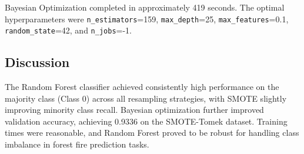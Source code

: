 Bayesian Optimization completed in approximately 419 seconds. The optimal hyperparameters were \texttt{n\_estimators}=159, \texttt{max\_depth}=25, \texttt{max\_features}=0.1, \texttt{random\_state}=42, and \texttt{n\_jobs}=-1.

\subsection{Discussion}

The Random Forest classifier achieved consistently high performance on the majority class (Class 0) across all resampling strategies, with SMOTE slightly improving minority class recall. Bayesian optimization further improved validation accuracy, achieving 0.9336 on the SMOTE-Tomek dataset. Training times were reasonable, and Random Forest proved to be robust for handling class imbalance in forest fire prediction tasks.
